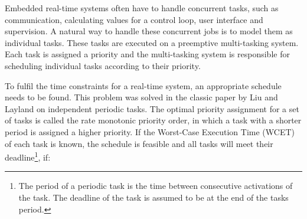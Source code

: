 Embedded real-time systems often have to handle concurrent tasks,
such as communication, calculating values for a control loop, user
interface and supervision. A natural way to handle these concurrent
jobs is to model them as individual tasks. These tasks are executed
on a preemptive multi-tasking system. Each task is assigned a
priority and the multi-tasking system is responsible for scheduling
individual tasks according to their priority.


To fulfil the time constraints for a real-time system, an
appropriate schedule needs to be found. This problem was solved in
the classic paper by Liu and Layland \cite{321743} on independent
periodic tasks. The optimal priority assignment for a set of tasks
is called the rate monotonic priority order, in which a task with a
shorter period is assigned a higher priority. If the Worst-Case
Execution Time (WCET) of each task is known, the schedule is
feasible and all tasks will meet their deadline\footnote{The period
of a periodic task is the time between consecutive activations of
the task. The deadline of the task is assumed to be at the end of
the tasks period.}, if:

